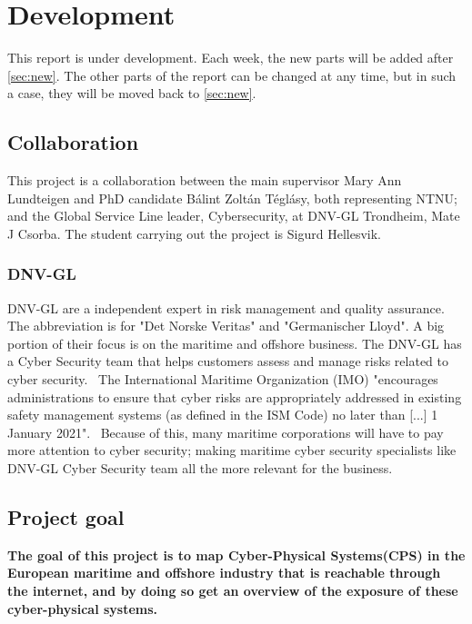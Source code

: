 \section{Development}
This report is under development. Each week, the new parts will be added after \cref{sec:new}. The other parts of the report can be changed at any time, but in such a case, they will be moved back to \cref{sec:new}.

\subsection{Collaboration}\label{sec:collaboration}
This project is a collaboration between the main supervisor Mary Ann Lundteigen and PhD candidate Bálint Zoltán Téglásy, both representing NTNU; and the Global Service Line leader, Cybersecurity, at DNV-GL Trondheim,  Mate J Csorba. The student carrying out the project is Sigurd Hellesvik.

\subsubsection{DNV-GL}\label{sec:dnvgl}
DNV-GL are a independent expert in risk management and quality assurance. The abbreviation is for "Det Norske Veritas" and "Germanischer Lloyd". A big portion of their focus is on the maritime and offshore business. The DNV-GL has a Cyber Security team that helps customers assess and manage risks related to cyber security.~\cite{DNVGL_cybersec}  The International Maritime Organization (IMO) "encourages administrations to ensure that cyber risks are appropriately addressed in existing safety management systems (as defined in the ISM Code) no later than [...] 1 January 2021".~\cite{IMO_2021} Because of this, many maritime corporations will have to pay more attention to cyber security; making maritime cyber security specialists like DNV-GL Cyber Security team all the more relevant for the business. 

\subsection{Project goal}\label{sec:goal}
\textbf{The goal of this project is to map Cyber-Physical Systems(CPS) in the European maritime and offshore industry that is reachable through the internet, and by doing so get an overview of the exposure of these cyber-physical systems.}




